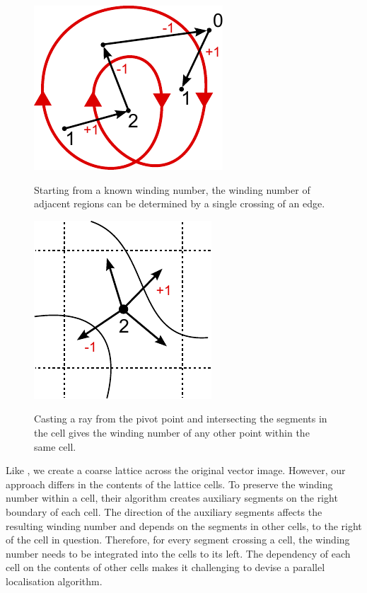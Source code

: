 \documentclass[11pt,a4paper,twoside]{article}
\begin{document}
\begin {figure}
\centering
\begin {minipage} [b] {0.45\linewidth}
	\centering
	\includegraphics [width=0.6\columnwidth]{figures/ray_our}
	\caption {Starting from a known winding number, the winding number of adjacent regions can be determined by a single crossing of an edge.}
	\label {fig:ray_our}
\end {minipage}
\hspace{0.5cm}
\begin{minipage} [b] {0.45\linewidth}
	\centering
	\includegraphics [width=0.6\columnwidth]{figures/cell}
	\caption {Casting a ray from the pivot point and intersecting the segments in the cell gives the winding number of any other point within the same cell.}
	\label {fig:cell}	
\end {minipage}
\end {figure}

Like \cite{NehabHoppe08}, we create a coarse lattice across the original vector image. However, our approach differs in the contents of the lattice cells. To preserve the winding number within a cell, their algorithm creates auxiliary segments on the right boundary of each cell. The direction of the auxiliary segments affects the resulting winding number and depends on the segments in other cells, to the right of the cell in question. Therefore, for every segment crossing a cell, the winding number needs to be integrated into the cells to its left. The dependency of each cell on the contents of other cells makes it challenging to devise a parallel localisation algorithm.
\end{document}

